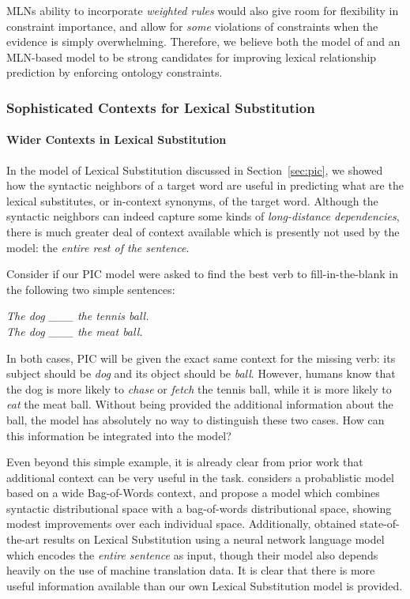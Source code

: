 \documentclass[12pt]{article}
\begin{document}
MLNs ability to incorporate {\em weighted rules} would also give room for
flexibility in constraint importance, and allow for {\em some} violations of
constraints when the evidence is simply overwhelming. Therefore, we believe
both the model of  and an MLN-based model to be strong
candidates for improving lexical relationship prediction by enforcing ontology
constraints.

\subsubsection{Sophisticated Contexts for Lexical Substitution}

\paragraph{Wider Contexts in Lexical Substitution}
In the model of Lexical Substitution discussed in Section~\ref{sec:pic}, we
showed how the syntactic neighbors of a target word are useful in predicting
what are the lexical substitutes, or in-context synonyms, of the target word.
Although the syntactic neighbors can indeed capture some kinds of {\em long-distance
dependencies}, there is much greater deal of context available which is
presently not used by the model: the {\em entire rest of the sentence}.

Consider if our PIC model were asked to find the best verb
to fill-in-the-blank in the following two simple sentences:

\begin{center}
  {\em The dog \_\_\_ the tennis ball.}\\
  {\em The dog \_\_\_ the meat ball.}
\end{center}

In both cases, PIC will be given the exact same context for the missing
verb: its subject should be {\em dog} and its object should be {\em ball}. However,
humans know that the dog is more likely to {\em chase} or {\em fetch} the tennis
ball, while it is more likely to {\em eat} the meat ball. Without being provided
the additional information about the ball, the model has absolutely no way
to distinguish these two cases. How can this information be integrated into the
model?

Even beyond this simple example, it is already clear from prior work that
additional context can be very useful in the task.  considers
a probablistic model based on a wide Bag-of-Words context, and
 propose a model which combines
syntactic distributional space with a bag-of-words distributional space,
showing modest improvements over each individual space. Additionally,
 obtained state-of-the-art results on Lexical
Substitution using a neural network language model which encodes the {\em
entire sentence} as input, though their model also depends heavily on the use
of machine translation data. It is clear that there is more useful information
available than our own Lexical Substitution model is provided.
\end{document}
